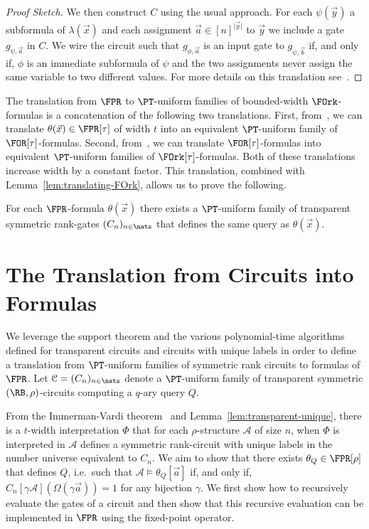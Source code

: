 \documentclass[a4paper,UKenglish]{lipics-v2018}
\begin{document}
\begin{proof}[Proof Sketch]
  We then construct $C$ using the usual approach. For each $\psi(\vec{y})$ a
  subformula of $\lambda(\vec{x})$ and each assignment $\vec{a} \in [n]^{\vert
    \vec{y} \vert}$ to $\vec{y}$ we include a gate $g_{\psi, \vec{a}}$ in $C$.
  We wire the circuit such that $g_{\phi, \vec{a}}$ is an input gate to
  $g_{\psi, \vec{b}}$ if, and only if, $\phi$ is an immediate subformula of
  $\psi$ and the two assignments never assign the same variable to two different
  values. For more details on this translation see~\cite{DW-arxiv}.
\end{proof}

The translation from $\FPR$ to $\PT$-uniform families of bounded-width
$\FOrk$-formulas is a concatenation of the following two translations. First,
from~\cite{Dawar09logicswith}, we can translate $\theta(\vec{x}) \in \FPR[\tau]$
of width $t$ into an equivalent $\PT$-uniform family of $\FOR[\tau]$-formulas.
Second, from~\cite{libkin2004elements}, we can translate $\FOR[\tau]$-formulas
into equivalent $\PT$-uniform families of $\FOrk[\tau]$-formulas. Both of these
translations increase width by a constant factor. This translation, combined
with Lemma~\ref{lem:translating-FOrk}, allows us to prove the following.

\begin{theorem}
  For each $\FPR$-formula $\theta(\vec{x})$ there exists a $\PT$-uniform family
  of transparent symmetric rank-gates $(C_n)_{n \in \nats}$ that defines the
  same query as $\theta(\vec{x})$.
  \label{thm:translating-formulas-to-circuits}
\end{theorem}

\section{The Translation from Circuits into Formulas}
We leverage the support theorem and the various polynomial-time algorithms
defined for transparent circuits and circuits with unique labels in order to
define a translation from $\PT$-uniform families of  symmetric rank circuits to
formulas of $\FPR$. Let $\mathcal{C} = (C_n)_{n \in \nats}$ denote a 
$\PT$-uniform family of transparent symmetric $(\RB, \rho)$-circuits computing a
$q$-ary query $Q$.

From the Immerman-Vardi theorem~\cite{Immerman198686, Vardi:1982} and
Lemma~\ref{lem:transparent-unique}, there is a $t$-width interpretation $\Phi$
that for each $\rho$-structure $\mathcal{A}$ of size $n$, when $\Phi$ is
interpreted in $\mathcal{A}$ defines a symmetric rank-circuit with unique labels
in the number universe equivalent to $C_n$. We aim to show that there exists
$\theta_Q \in \FPR[\rho]$ that defines $Q$, i.e.\ such that 
$\mathcal{A} \models \theta_Q[\vec{a}]$ if, and only if, $C_n[\gamma
\mathcal{A}](\Omega (\gamma \vec{a})) = 1$ for any bijection $\gamma$. We
first show how to recursively evaluate the gates of a circuit and then show that
this recursive evaluation can be implemented in $\FPR$ using the fixed-point
operator. 
\end{document}
